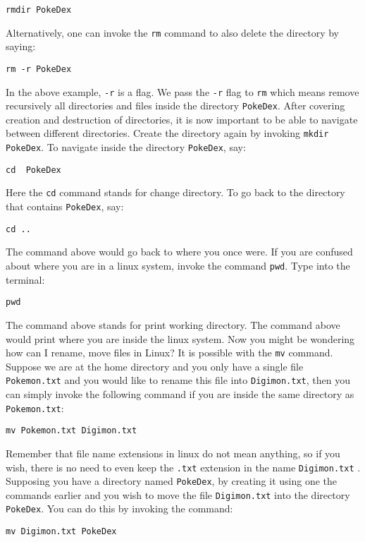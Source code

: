 \documentclass[a4paper, 12pt]{report}
\begin{document}
\begin{center}
\begin{lstlisting}
rmdir PokeDex
\end{lstlisting}
Alternatively, one can invoke the \texttt{rm} command to also delete the directory by saying:
\begin{lstlisting}
rm -r PokeDex
\end{lstlisting}
In the above example, \texttt{-r} is a flag. We pass the \texttt{-r} flag to \texttt{rm} which means remove recursively all directories and files inside the directory \texttt{PokeDex}. After covering creation and destruction of directories, it is now important to be able to navigate between different directories. Create the directory again by invoking \texttt{mkdir PokeDex}. To navigate inside the directory \texttt{PokeDex}, say:
\begin{lstlisting}
cd  PokeDex
\end{lstlisting}
Here the \texttt{cd} command stands for change directory. To go back to the directory that contains \texttt{PokeDex}, say:
\begin{lstlisting}
cd ..
\end{lstlisting}
The command above would go back to where you once were. If you are confused about where you are in a linux system, invoke the command \texttt{pwd}. Type into the terminal:
\begin{lstlisting}
pwd
\end{lstlisting}
The command above stands for print working directory. The command above would print where you are inside the linux system. Now you might be wondering how can I rename, move files in Linux? It is possible with the \texttt{mv} command. Suppose we are at the home directory and you only have a single file \texttt{Pokemon.txt} and you would like to rename this file into \texttt{Digimon.txt}, then you can simply invoke the following command if you are inside the same directory as \texttt{Pokemon.txt}:
\begin{lstlisting}
mv Pokemon.txt Digimon.txt
\end{lstlisting}
Remember that file name extensions in linux do not mean anything, so if you wish, there is no need to even keep the \texttt{.txt} extension in the name \texttt{Digimon.txt} . Supposing you have a directory named \texttt{PokeDex}, by creating it using one the commands earlier and you wish to move the file \texttt{Digimon.txt} into the directory \texttt{PokeDex}. You can do this by invoking the command:
\begin{lstlisting}
mv Digimon.txt PokeDex
\end{lstlisting}

\end{center}
\end{document}

